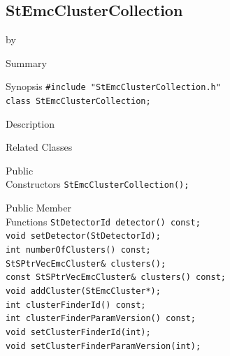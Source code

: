 \documentclass[twoside]{article}
\newcommand{\entrylabel}[1]{\mbox{\textbf{{#1}}}\hfil}%
\newenvironment{entry}
{\begin{list}{}%
    {\renewcommand{\makelabel}{\entrylabel}%
     \setlength{\labelwidth}{90pt}%
     \setlength{\leftmargin}{\labelwidth}
     \advance\leftmargin by \labelsep%
      }%
    }%
  {\end{list}}
\newcommand{\Entrylabel}[1]%
{\raisebox{0pt}[1ex][0pt]{\makebox[\labelwidth][l]%
    {\parbox[t]{\labelwidth}{\hspace{0pt}\textbf{{#1}}}}}}
\newenvironment{Entry}%
{\renewcommand{\entrylabel}{\Entrylabel}\begin{entry}}%
  {\end{entry}}
\begin{document}
\subsection{StEmcClusterCollection}
\label{sec:StEmcClusterCollection}
\begin{Entry}
\item[Summary]
\item[Synopsis]
    \verb+#include "StEmcClusterCollection.h"+\\
    \verb+class StEmcClusterCollection;+\\
\item[Description]
\item[Related Classes]
\item[Public\\ Constructors]
    \verb+StEmcClusterCollection();+\\
\item[Public Member\\ Functions]
    \verb+StDetectorId detector() const;+\\
    \verb+void setDetector(StDetectorId);+\\
    \verb+int numberOfClusters() const;+\\
    \verb+StSPtrVecEmcCluster& clusters();+\\
    \verb+const StSPtrVecEmcCluster& clusters() const;+\\
    \verb+void addCluster(StEmcCluster*);+\\
    \verb+int clusterFinderId() const;+\\
    \verb+int clusterFinderParamVersion() const;+\\
    \verb+void setClusterFinderId(int);+\\
    \verb+void setClusterFinderParamVersion(int);+\\
\end{Entry}
\clearpage
\end{document}
